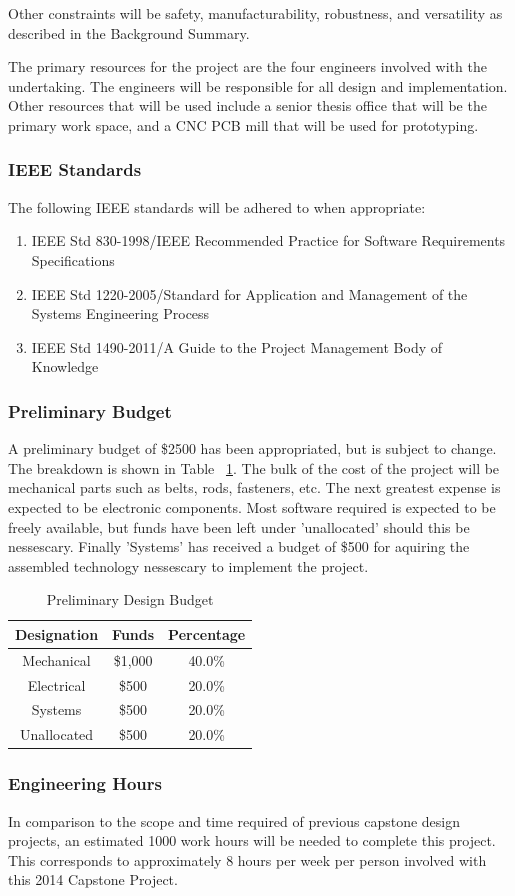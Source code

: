 \documentclass[11pt]{report}
\begin{document}
\par Other constraints will be safety, manufacturability, robustness, and versatility as described in the Background Summary.

\par The primary resources for the project are the four engineers involved with the undertaking. The engineers will be responsible for all design and implementation. Other resources that will be used include a senior thesis office that will be the primary work space, and a CNC PCB mill that will be used for prototyping.

\subsubsection{IEEE Standards}
\par The following IEEE standards will be adhered to when appropriate:
\begin{enumerate} \parskip2pt
	\item IEEE Std 830-1998/IEEE Recommended Practice for Software Requirements Speciﬁcations
	\item IEEE Std 1220-2005/Standard for Application and Management of the Systems Engineering Process
	\item IEEE Std 1490-2011/A Guide to the Project Management Body of Knowledge
\end{enumerate}

\subsubsection{Preliminary Budget}
\par A preliminary budget of \$2500 has been appropriated, but is subject to change. The breakdown is shown in Table ~\ref{table:budget}. The bulk of the cost of the project will be mechanical parts such as belts, rods, fasteners, etc. The next greatest expense is expected to be electronic components. Most software required is expected to be freely available, but funds have been left under 'unallocated' should this be nessescary. Finally 'Systems' has received a budget of \$500 for aquiring the assembled technology nessescary to implement the project. 

\begin{table}[ht] 
	\centering 
	\begin{tabular}{c c c} 
		Designation	& Funds 		& Percentage\\
		\hline
		Mechanical	& \$1,000 	& 40.0\% \\ 
		Electrical	& \$500 		& 20.0\% \\ 
		Systems		& \$500 		& 20.0\% \\ 
		Unallocated	& \$500 		& 20.0\% \\
	\end{tabular} 
	\caption{Preliminary Design Budget}
	\label{table:budget}
\end{table}

\subsubsection{Engineering Hours}
\par In comparison to the scope and time required of previous capstone design projects, an estimated 1000 work hours will be needed to complete this project. This corresponds to approximately 8 hours per week per person involved with this 2014 Capstone Project.
\end{document}
